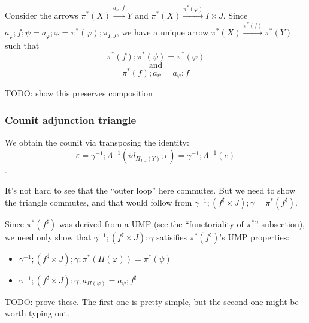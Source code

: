 \documentclass{article}
\begin{document}
Consider the arrows $\pi^*(X) \overset{a_\varphi;f}{\longrightarrow} Y$ and $\pi^*(X) \overset{\pi^*(\varphi)}{\longrightarrow} I \times J$. 
Since $a_{\varphi};f;\psi = a_{\varphi};\varphi = \pi^*(\varphi);\pi_{I,J}$, we have a unique arrow $\pi^*(X) \overset{\pi^*(f)}{\longrightarrow} \pi^*(Y)$ such that 
$$\pi^*(f);\pi^*(\psi) = \pi^*(\varphi)$$
$$\text{and}$$
$$\pi^*(f);a_{\psi} = a_\varphi;f$$

TODO: show this preserves composition

\subsubsection*{Counit adjunction triangle}

We obtain the counit via transposing the identity: 
$$\varepsilon = \gamma^{-1};\Lambda^{-1}(\mathit{id_{\Pi_{I,J}(Y)}};e) = \gamma^{-1};\Lambda^{-1}(e)$$.

\begin{center}
\end{center}

It's not hard to see that the ``outer loop'' here commutes. But we need to show the triangle commutes, and that would follow from $\gamma^{-1};(f^\sharp \times J);\gamma = \pi^*(f^\sharp)$. 

Since $\pi^*(f^\sharp)$ was derived from a UMP (see the ``functoriality of $\pi^*$'' subsection), we need only show that $\gamma^{-1};(f^\sharp \times J);\gamma$ satisifies $\pi^*(f^\sharp)$'s UMP properties:

\begin{itemize}
\item $\gamma^{-1};(f^\sharp \times J);\gamma;\pi^*(\Pi(\varphi)) = \pi^*(\psi)$
\item $\gamma^{-1};(f^\sharp \times J);\gamma;a_{\Pi(\varphi)} = a_{\psi};f^{\sharp}$
\end{itemize}

TODO: prove these. The first one is pretty simple, but the second one might be worth typing out.
\end{document}
